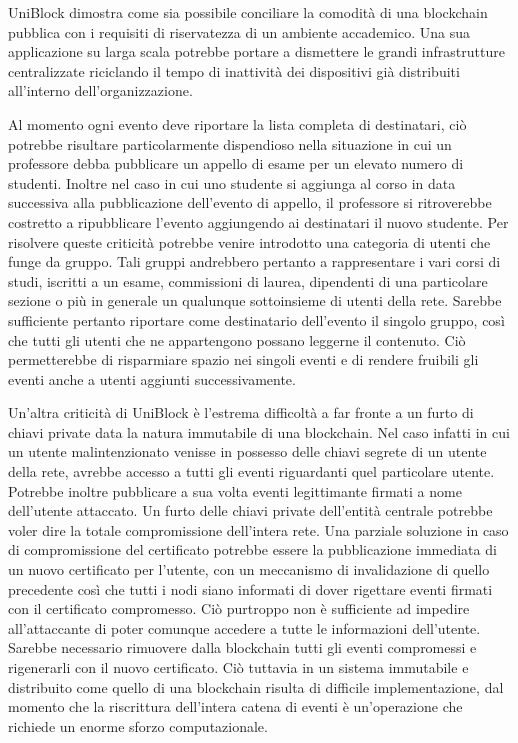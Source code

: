 UniBlock dimostra come sia possibile conciliare la comodit\`a di una blockchain pubblica con i requisiti di riservatezza di un ambiente accademico. Una sua applicazione su larga scala potrebbe portare a dismettere le grandi infrastrutture centralizzate riciclando il tempo di inattivit\`a dei dispositivi gi\`a distribuiti all'interno dell'organizzazione.

Al momento ogni evento deve riportare la lista completa di destinatari, ci\`o potrebbe risultare particolarmente dispendioso nella situazione in cui un professore debba pubblicare un appello di esame per un elevato numero di studenti. Inoltre nel caso in cui uno studente si aggiunga al corso in data successiva alla pubblicazione dell'evento di appello, il professore si ritroverebbe costretto a ripubblicare l'evento aggiungendo ai destinatari il nuovo studente. Per risolvere queste criticit\`a potrebbe venire introdotto una categoria di utenti che funge da gruppo. Tali gruppi andrebbero pertanto a rappresentare i vari corsi di studi, iscritti a un esame, commissioni di laurea, dipendenti di una particolare sezione o pi\`u in generale un qualunque sottoinsieme di utenti della rete. Sarebbe sufficiente pertanto riportare come destinatario dell'evento il singolo gruppo, cos\`i che tutti gli utenti che ne appartengono possano leggerne il contenuto. Ci\`o permetterebbe di risparmiare spazio nei singoli eventi e di rendere fruibili gli eventi anche a utenti aggiunti successivamente.

Un'altra criticit\`a di UniBlock \`e l'estrema difficolt\`a a far fronte a un furto di chiavi private data la natura immutabile di una blockchain. Nel caso infatti in cui un utente malintenzionato venisse in possesso delle chiavi segrete di un utente della rete, avrebbe accesso a tutti gli eventi riguardanti quel particolare utente. Potrebbe inoltre pubblicare a sua volta eventi legittimante firmati a nome dell'utente attaccato. Un furto delle chiavi private dell'entit\`a centrale potrebbe voler dire la totale compromissione dell'intera rete. Una parziale soluzione in caso di compromissione del certificato potrebbe essere la pubblicazione immediata di un nuovo certificato per l'utente, con un meccanismo di invalidazione di quello precedente cos\`i che tutti i nodi siano informati di dover rigettare eventi firmati con il certificato compromesso. Ci\`o purtroppo non \`e sufficiente ad impedire all'attaccante di poter comunque accedere a tutte le informazioni dell'utente. Sarebbe necessario rimuovere dalla blockchain tutti gli eventi compromessi e rigenerarli con il nuovo certificato. Ci\`o tuttavia in un sistema immutabile e distribuito come quello di una blockchain risulta di difficile implementazione, dal momento che la riscrittura dell'intera catena di eventi \`e un'operazione che richiede un enorme sforzo computazionale.
